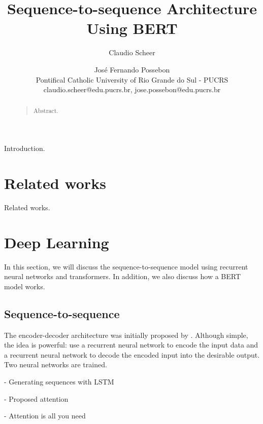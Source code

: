 \documentclass[letterpaper]{article}
\begin{document}
%
\title{Sequence-to-sequence Architecture\\Using BERT}
\author{Claudio Scheer \and Jos\'e Fernando Possebon\\
    Pontifical Catholic University of Rio Grande do Sul - PUCRS\\
    claudio.scheer@edu.pucrs.br,
    jose.possebon@edu.pucrs.br
}

\maketitle

\begin{abstract}
    \begin{quote}
        Abstract.
    \end{quote}
\end{abstract}

\noindent Introduction.


\section{Related works}
Related works.


\section{Deep Learning}

In this section, we will discuss the sequence-to-sequence model using recurrent neural networks and transformers. In addition, we also discuss how a BERT model works.

\subsection{Sequence-to-sequence}

The encoder-decoder architecture was initially proposed by \cite{DBLP:journals/corr/ChoMGBSB14}. Although simple, the idea is powerful: use a recurrent neural network to encode the input data and a recurrent neural network to decode the encoded input into the desirable output. Two neural networks are trained.

\cite{DBLP:journals/corr/Graves13} - Generating sequences with LSTM

\cite{DBLP:journals/corr/BahdanauCB14} - Proposed attention

\cite{DBLP:journals/corr/VaswaniSPUJGKP17} - Attention is all you need
\end{document}
